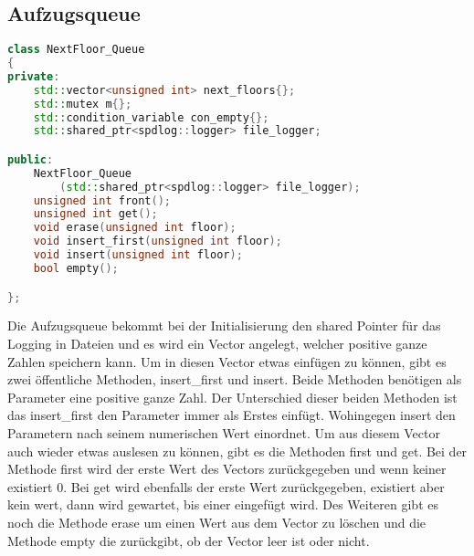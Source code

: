 \subsection{Aufzugsqueue}

\begin{lstlisting}[language=C++]
class NextFloor_Queue
{
private:
    std::vector<unsigned int> next_floors{};
    std::mutex m{};
    std::condition_variable con_empty{};
    std::shared_ptr<spdlog::logger> file_logger;

public:
    NextFloor_Queue
        (std::shared_ptr<spdlog::logger> file_logger);
    unsigned int front();
    unsigned int get();
    void erase(unsigned int floor);
    void insert_first(unsigned int floor);
    void insert(unsigned int floor);
    bool empty();

};
\end{lstlisting}

\vspace{5mm}

Die Aufzugsqueue bekommt bei der Initialisierung den shared Pointer für das Logging in Dateien und es wird ein Vector angelegt, welcher positive ganze Zahlen speichern kann. Um in diesen Vector etwas einfügen zu können, gibt es zwei öffentliche Methoden, insert\_first und insert. Beide Methoden benötigen als Parameter eine positive ganze Zahl. Der Unterschied dieser beiden Methoden ist das insert\_first den Parameter immer als Erstes einfügt. Wohingegen insert den Parametern nach seinem numerischen Wert einordnet. Um aus diesem Vector auch wieder etwas auslesen zu können, gibt es die Methoden first und get. Bei der Methode first wird der erste Wert des Vectors zurückgegeben und wenn keiner existiert 0. Bei get wird ebenfalls der erste Wert zurückgegeben, existiert aber kein wert, dann wird gewartet, bis einer eingefügt wird. Des Weiteren gibt es noch die Methode erase um einen Wert aus dem Vector zu löschen und die Methode empty die zurückgibt, ob der Vector leer ist oder nicht.